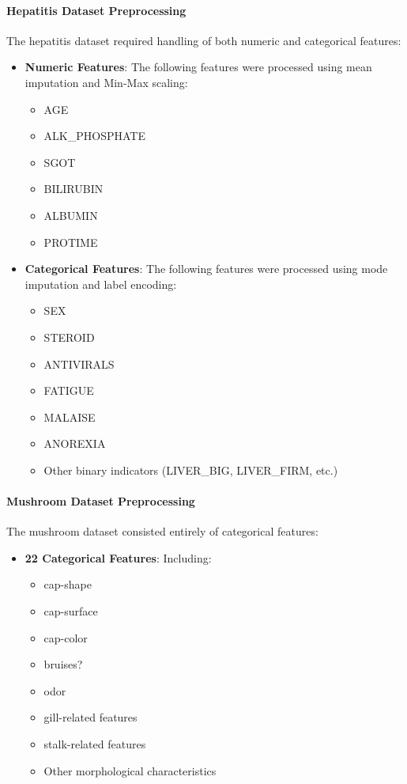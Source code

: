 \paragraph{Hepatitis Dataset Preprocessing}
The hepatitis dataset required handling of both numeric and categorical features:
\begin{itemize}
    \item \textbf{Numeric Features}: The following features were processed using mean imputation and Min-Max scaling:
    \begin{itemize}
        \item AGE
        \item ALK\_PHOSPHATE
        \item SGOT
        \item BILIRUBIN
        \item ALBUMIN
        \item PROTIME
    \end{itemize}
    \item \textbf{Categorical Features}: The following features were processed using mode imputation and label encoding:
    \begin{itemize}
        \item SEX
        \item STEROID
        \item ANTIVIRALS
        \item FATIGUE
        \item MALAISE
        \item ANOREXIA
        \item Other binary indicators (LIVER\_BIG, LIVER\_FIRM, etc.)
    \end{itemize}
\end{itemize}

\paragraph{Mushroom Dataset Preprocessing}
The mushroom dataset consisted entirely of categorical features:
\begin{itemize}
\item \textbf{22 Categorical Features}: Including:
    \begin{itemize}
    \item cap-shape
    \item cap-surface
    \item cap-color
    \item bruises?
    \item odor
    \item gill-related features
    \item stalk-related features
    \item Other morphological characteristics
    \end{itemize}
\end{itemize}

